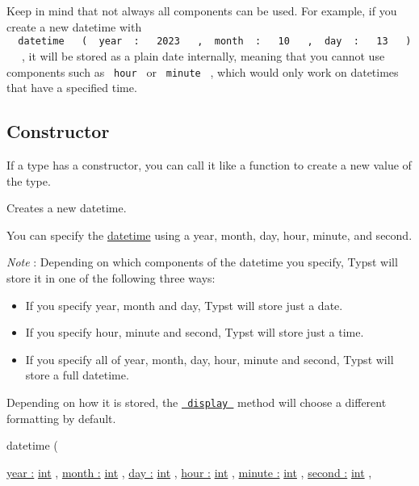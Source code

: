 Keep in mind that not always all components can be used. For example, if
you create a new datetime with
\texttt{\ }{\texttt{\ datetime\ }}\texttt{\ }{\texttt{\ (\ }}\texttt{\ year\ }{\texttt{\ :\ }}\texttt{\ }{\texttt{\ 2023\ }}\texttt{\ }{\texttt{\ ,\ }}\texttt{\ month\ }{\texttt{\ :\ }}\texttt{\ }{\texttt{\ 10\ }}\texttt{\ }{\texttt{\ ,\ }}\texttt{\ day\ }{\texttt{\ :\ }}\texttt{\ }{\texttt{\ 13\ }}\texttt{\ }{\texttt{\ )\ }}\texttt{\ }
, it will be stored as a plain date internally, meaning that you cannot
use components such as \texttt{\ hour\ } or \texttt{\ minute\ } , which
would only work on datetimes that have a specified time.

\subsection{\texorpdfstring{Constructor
{}}{Constructor }}\label{constructor}

\label{constructor-constructor-tooltip}
If a type has a constructor, you can call it like a function to create a
new value of the type.

Creates a new datetime.

You can specify the
\href{/docs/reference/foundations/datetime/}{datetime} using a year,
month, day, hour, minute, and second.

\emph{Note} : Depending on which components of the datetime you specify,
Typst will store it in one of the following three ways:

\begin{itemize}
\tightlist
\item
  If you specify year, month and day, Typst will store just a date.
\item
  If you specify hour, minute and second, Typst will store just a time.
\item
  If you specify all of year, month, day, hour, minute and second, Typst
  will store a full datetime.
\end{itemize}

Depending on how it is stored, the
\href{/docs/reference/foundations/datetime/\#definitions-display}{\texttt{\ display\ }}
method will choose a different formatting by default.

{ datetime } (

{ \hyperref[constructor-parameters-year]{year :}
\href{/docs/reference/foundations/int/}{int} , } {
\hyperref[constructor-parameters-month]{month :}
\href{/docs/reference/foundations/int/}{int} , } {
\hyperref[constructor-parameters-day]{day :}
\href{/docs/reference/foundations/int/}{int} , } {
\hyperref[constructor-parameters-hour]{hour :}
\href{/docs/reference/foundations/int/}{int} , } {
\hyperref[constructor-parameters-minute]{minute :}
\href{/docs/reference/foundations/int/}{int} , } {
\hyperref[constructor-parameters-second]{second :}
\href{/docs/reference/foundations/int/}{int} , }

